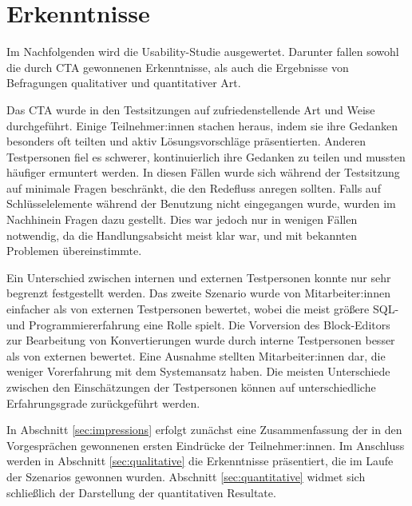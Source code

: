 \section{Erkenntnisse}

Im Nachfolgenden wird die Usability-Studie ausgewertet. Darunter fallen sowohl die durch \acs{CTA} gewonnenen Erkenntnisse, als auch die Ergebnisse von Befragungen qualitativer und quantitativer Art.

Das \ac{CTA} wurde in den Testsitzungen auf zufriedenstellende Art und Weise durchgeführt. Einige Teilnehmer:innen stachen heraus, indem sie ihre Gedanken besonders oft teilten und aktiv Lösungsvorschläge präsentierten. Anderen Testpersonen fiel es schwerer, kontinuierlich ihre Gedanken zu teilen und mussten häufiger ermuntert werden. In diesen Fällen wurde sich während der Testsitzung auf minimale Fragen beschränkt, die den Redefluss anregen sollten. Falls auf Schlüsselelemente während der Benutzung nicht eingegangen wurde, wurden im Nachhinein Fragen dazu gestellt. Dies war jedoch nur in wenigen Fällen notwendig, da die Handlungsabsicht meist klar war, und mit bekannten Problemen übereinstimmte.

Ein Unterschied zwischen internen und externen Testpersonen konnte nur sehr begrenzt festgestellt werden. Das zweite Szenario wurde von Mitarbeiter:innen einfacher als von externen Testpersonen bewertet, wobei die meist größere \ac{SQL}- und Programmiererfahrung eine Rolle spielt. Die Vorversion des Block-Editors zur Bearbeitung von Konvertierungen wurde durch interne Testpersonen besser als von externen bewertet. Eine Ausnahme stellten Mitarbeiter:innen dar, die weniger Vorerfahrung mit dem Systemansatz haben. Die meisten Unterschiede zwischen den Einschätzungen der Testpersonen können auf unterschiedliche  Erfahrungsgrade zurückgeführt werden.

In Abschnitt \ref{sec:impressions} erfolgt zunächst eine Zusammenfassung der in den Vorgesprächen gewonnenen ersten Eindrücke der Teilnehmer:innen. Im Anschluss werden in Abschnitt \ref{sec:qualitative} die Erkenntnisse präsentiert, die im Laufe der Szenarios gewonnen wurden. Abschnitt \ref{sec:quantitative} widmet sich schließlich der Darstellung der quantitativen Resultate.
